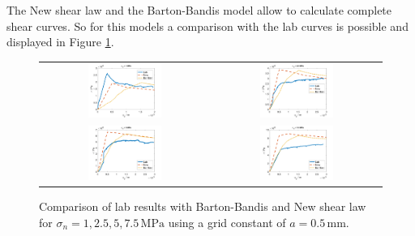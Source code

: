 The New shear law and the Barton-Bandis model allow to calculate complete shear curves. So for this models a comparison with the lab curves is possible and displayed in Figure \ref{fig:MEX7_New-Lab-BB}. 

\begin{figure}[!ht]
\begin{center}
\begin{tabular}{c c}
\includegraphics[width=0.45\textwidth]{./figures/MEX7_New-vs-Lab-vs-BB1.png} &
\includegraphics[width=0.45\textwidth]{./figures/MEX7_New-vs-Lab-vs-BB2.png} \\
\includegraphics[width=0.45\textwidth]{./figures/MEX7_New-vs-Lab-vs-BB3.png} &
\includegraphics[width=0.45\textwidth]{./figures/MEX7_New-vs-Lab-vs-BB4.png}\\
\end{tabular}
\end{center}
\caption{Comparison of lab results with Barton-Bandis and New shear law for $\sigma_n=1,2.5,5,7.5\,\text{MPa}$ using a grid constant of $a=0.5\,\text{mm}$.}
\label{fig:MEX7_New-Lab-BB}
\end{figure}

